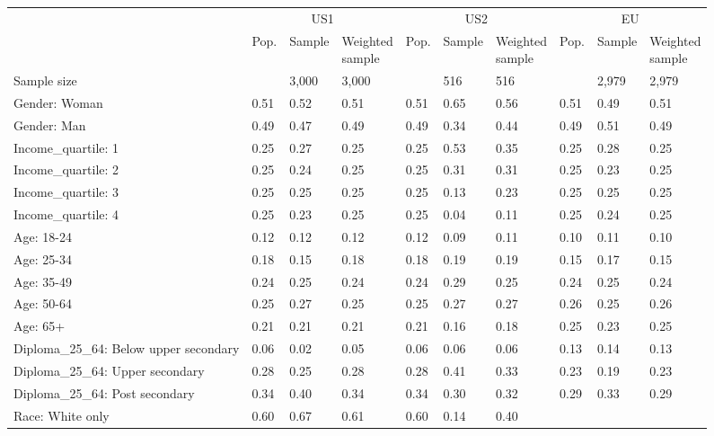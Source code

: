 
\begin{tabular}[t]{llllllllll}
\toprule
\multicolumn{1}{c}{} & \multicolumn{3}{c}{US1} & \multicolumn{3}{c}{US2} & \multicolumn{3}{c}{EU} \\
\cmidrule(l{3pt}r{3pt}){2-4} \cmidrule(l{3pt}r{3pt}){5-7} \cmidrule(l{3pt}r{3pt}){8-10}
  & Pop. & Sample & \makecell{Weighted\\sample} & Pop. & Sample & \makecell{Weighted\\sample} & Pop. & Sample & \makecell{Weighted\\sample}\\
\midrule
Sample size &  & 3,000 & 3,000 &  & 516 & 516 &  & 2,979 & 2,979\\
\addlinespace
Gender: Woman & 0.51 & 0.52 & 0.51 & 0.51 & 0.65 & 0.56 & 0.51 & 0.49 & 0.51\\
Gender: Man & 0.49 & 0.47 & 0.49 & 0.49 & 0.34 & 0.44 & 0.49 & 0.51 & 0.49\\
\addlinespace
Income\_quartile: 1 & 0.25 & 0.27 & 0.25 & 0.25 & 0.53 & 0.35 & 0.25 & 0.28 & 0.25\\
Income\_quartile: 2 & 0.25 & 0.24 & 0.25 & 0.25 & 0.31 & 0.31 & 0.25 & 0.23 & 0.25\\
Income\_quartile: 3 & 0.25 & 0.25 & 0.25 & 0.25 & 0.13 & 0.23 & 0.25 & 0.25 & 0.25\\
Income\_quartile: 4 & 0.25 & 0.23 & 0.25 & 0.25 & 0.04 & 0.11 & 0.25 & 0.24 & 0.25\\
\addlinespace
Age: 18-24 & 0.12 & 0.12 & 0.12 & 0.12 & 0.09 & 0.11 & 0.10 & 0.11 & 0.10\\
Age: 25-34 & 0.18 & 0.15 & 0.18 & 0.18 & 0.19 & 0.19 & 0.15 & 0.17 & 0.15\\
Age: 35-49 & 0.24 & 0.25 & 0.24 & 0.24 & 0.29 & 0.25 & 0.24 & 0.25 & 0.24\\
Age: 50-64 & 0.25 & 0.27 & 0.25 & 0.25 & 0.27 & 0.27 & 0.26 & 0.25 & 0.26\\
Age: 65+ & 0.21 & 0.21 & 0.21 & 0.21 & 0.16 & 0.18 & 0.25 & 0.23 & 0.25\\
\addlinespace
Diploma\_25\_64: Below upper secondary & 0.06 & 0.02 & 0.05 & 0.06 & 0.06 & 0.06 & 0.13 & 0.14 & 0.13\\
Diploma\_25\_64: Upper secondary & 0.28 & 0.25 & 0.28 & 0.28 & 0.41 & 0.33 & 0.23 & 0.19 & 0.23\\
Diploma\_25\_64: Post secondary & 0.34 & 0.40 & 0.34 & 0.34 & 0.30 & 0.32 & 0.29 & 0.33 & 0.29\\
\addlinespace
Race: White only & 0.60 & 0.67 & 0.61 & 0.60 & 0.14 & 0.40 &  &  & \\

\end{tabular}
